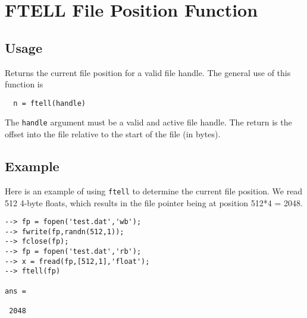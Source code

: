 \section{FTELL File Position Function}

\subsection{Usage}

Returns the current file position for a valid file handle.
The general use of this function is
\begin{verbatim}
  n = ftell(handle)
\end{verbatim}
The \verb|handle| argument must be a valid and active file handle.  The
return is the offset into the file relative to the start of the
file (in bytes).
\subsection{Example}

Here is an example of using \verb|ftell| to determine the current file 
position.  We read 512 4-byte floats, which results in the file 
pointer being at position 512*4 = 2048.
\begin{verbatim}
--> fp = fopen('test.dat','wb');
--> fwrite(fp,randn(512,1));
--> fclose(fp);
--> fp = fopen('test.dat','rb');
--> x = fread(fp,[512,1],'float');
--> ftell(fp)

ans = 

 2048 
\end{verbatim}
